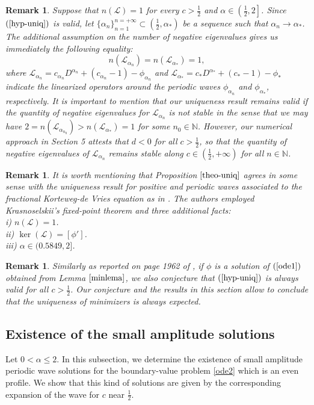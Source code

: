 \documentclass[12pt,reqno]{amsart}
\newcommand{\2}{L^2_{per}(0, T)}
\numberwithin{equation}{section}
\numberwithin{figure}{section}
\newtheorem{remark}[theorem]{Remark}
\begin{document}
\begin{remark}
	Suppose that $n(\mathcal{L})=1$ for every $c>\frac{1}{2}$ and $\alpha\in\left(\frac{1}{2},2\right]$. Since $(\ref{hyp-uniq})$ is valid, let $\{\alpha_n\}_{n=1}^{n=+\infty}\subset (\frac{1}{2}, \alpha_{*})$ be a sequence such that $\alpha_n\rightarrow \alpha_{*}$. The additional assumption on the number of negative eigenvalues gives us immediately the following equality:
	$$ n(\mathcal{L}_{\alpha_n})= n(\mathcal{L}_{\alpha_*})=1 ,$$
	where $\mathcal{L}_{\alpha_n}=c_{\alpha_n}D^{\alpha_n}+(c_{\alpha_n}-1)-
	\phi_{\alpha_n}$
	and $\mathcal{L}_{\alpha_*}=c_{*}D^{\alpha_{*}}+(c_{*}-1)-\phi_{*}$
	indicate the linearized operators around the periodic waves $\phi_{\alpha_{n}}$ and $\phi_{\alpha_{*}}$, respectively. It is important to mention that our uniqueness result remains valid if the quantity of negative eigenvalues for $\mathcal{L}_{\alpha_n}$ is not stable in the sense that we may have $2=n(\mathcal{L}_{\alpha_{n_0}})> n(\mathcal{L}_{\alpha_*})=1$ for some $n_0\in\mathbb{N}$. However, our numerical approach in Section 5 attests that $d<0$ for all $c>\frac{1}{2}$, so that the quantity of negative eigenvalues of $\mathcal{L}_{\alpha_n}$ remains stable along $c\in\left(\frac{1}{2},+\infty\right)$ for all $n\in\mathbb{N}$.
\end{remark}
\begin{remark}
	It is worth mentioning that Proposition $\ref{theo-uniq}$ agrees in some sense with the uniqueness result for positive and periodic waves associated to the fractional Korteweg-de Vries equation as in \cite{LP}. The authors employed  Krasnoselskii's fixed-point theorem and three additional facts:  \\
	i) $n(\mathcal{L})=1$.\\
	ii) $\ker(\mathcal{L})=[\phi']$.\\
	iii) $\alpha\in (0.5849,2]$.
	\end{remark}

\begin{remark}\label{rem12}
	Similarly as reported on page 1962 of \cite{NPL}, if $\phi$ is a solution of $(\ref{ode1})$ obtained from Lemma $\ref{minlema}$, we also conjecture that $(\ref{hyp-uniq})$ is always valid for all $c>\frac{1}{2}$. Our conjecture and the results in this section allow to conclude that the uniqueness of minimizers is always expected.
\end{remark}

\subsection{Existence of the small amplitude solutions}
Let $0<\alpha\leq 2$. In this subsection, we determine the existence of small amplitude periodic wave solutions for the boundary-value problem \eqref{ode2} which is   an even profile. We show that this kind of solutions are given by the corresponding expansion of the wave for $c$ near $\frac{1}{2}$.
\end{document}
